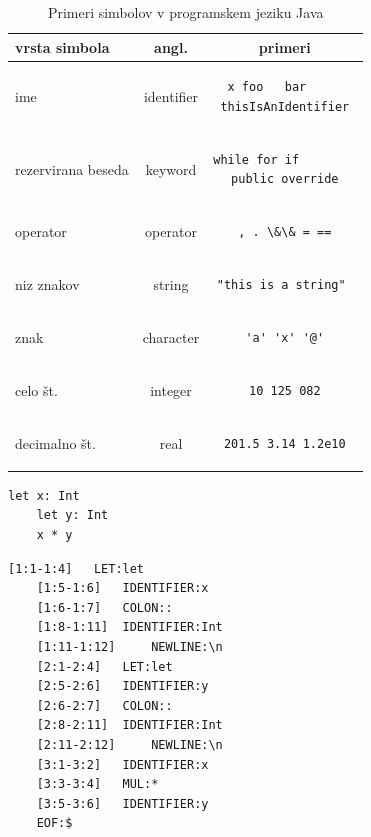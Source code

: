 \documentclass[a4paper, 12p]{book}
\begin{document}
\begin{table}
	\begin{center}
		\begin{tabular}{l|c|c}
			\textbf{vrsta simbola} & \textbf{angl.} & \textbf{primeri} \\ \hline\hline
			ime & identifier & 
\begin{lstlisting} 
x foo	bar		
thisIsAnIdentifier
\end{lstlisting} \\
			rezervirana beseda & keyword & 
\begin{lstlisting} 
while for if		
public override
\end{lstlisting} \\
			operator & operator & 
\begin{lstlisting} 
, . \&\& = ==
\end{lstlisting} \\
			niz znakov & string & 
\begin{lstlisting} 
"this is a string" 
\end{lstlisting} \\
			znak & character &
\begin{lstlisting} 
'a' 'x' '@'
\end{lstlisting} \\
			celo št. & integer &
\begin{lstlisting} 
10 125 082
\end{lstlisting} \\
			decimalno št. & real &
\begin{lstlisting} 
201.5 3.14 1.2e10
\end{lstlisting} \\
		\end{tabular}
	\end{center}
	\caption{Primeri simbolov v programskem jeziku Java}
	\label{tabel:vrsteZetonov}
\end{table}

\renewcommand{\lstlistingname}{Program}
\begin{lstlisting}[caption={Primer programa v programskem jeziku Atheris},label={lst:atherisCode}, captionpos=b]
	let x: Int
	let y: Int
	x * y
\end{lstlisting}

\renewcommand{\lstlistingname}{Izpis}
\begin{lstlisting}[caption={Rezultat leksikalne analize za program ~\ref{lst:atherisCode}},label={lst:lexedSource},captionpos=b]
	[1:1-1:4] 	LET:let
	[1:5-1:6] 	IDENTIFIER:x
	[1:6-1:7] 	COLON::
	[1:8-1:11] 	IDENTIFIER:Int
	[1:11-1:12] 	NEWLINE:\n
	[2:1-2:4] 	LET:let
	[2:5-2:6] 	IDENTIFIER:y
	[2:6-2:7] 	COLON::
	[2:8-2:11] 	IDENTIFIER:Int
	[2:11-2:12] 	NEWLINE:\n
	[3:1-3:2] 	IDENTIFIER:x
	[3:3-3:4] 	MUL:*
	[3:5-3:6] 	IDENTIFIER:y
	EOF:$
\end{lstlisting}
\end{document}
